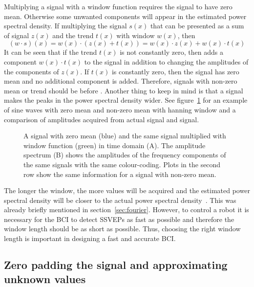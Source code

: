 Multiplying a signal with a \gls{window} function requires the signal to have zero mean. Otherwise some unwanted components will appear in the estimated \gls{power spectral density}. If multiplying the signal $s(x)$ that can be presented as a sum of  signal $z(x)$ and the trend $t(x)$ with \gls{window} $w(x)$, then
\begin{equation}
	(w\cdot s)(x) = w(x)\cdot(z(x)+t(x))=w(x)\cdot z(x)+w(x)\cdot t(x)
\end{equation}
It can be seen that if the \gls{trend} $t(x)$ is not constantly zero, then  adds a component $w(x)\cdot t(x)$ to the signal in addition to changing the amplitudes of the components of $z(x)$. If $t(x)$ is constantly zero, then the signal has zero \gls{mean} and no additional component is added. Therefore, signals with non-zero \gls{mean} or \gls{trend} should be  before . Another thing to keep in mind is that  a signal makes the peaks in the \gls{power spectral density} wider. See figure~\ref{fig:window} for an example of sine waves with zero \gls{mean} and non-zero \gls{mean}  with hanning \gls{window} and a comparison of amplitudes acquired from actual signal and  signal.

\begin{figure}[h!]
	
	\caption{A signal with zero mean (blue) and the same signal multiplied with window function (green) in time domain (A). The amplitude spectrum (B) shows the amplitudes of the frequency components of the same signals with the same colour-coding. Plots in the second row show the same information for a signal with non-zero mean.}
	\label{fig:window}
\end{figure}

The longer the window, the more values will be acquired and the estimated \gls{power spectral density} will be closer to the actual \gls{power spectral density}~\cite{psd}. This was already briefly mentioned in section~\ref{sec:fourier}. However, to control a robot it is necessary for the \gls{BCI} to detect \glspl{SSVEP} as fast as possible and therefore the \gls{window} length should be as short as possible. Thus, choosing the right \gls{window} length is important in designing a fast and accurate \gls{BCI}.

\subsection{Zero padding the signal and approximating unknown values}
\label{sec:interpolate}

